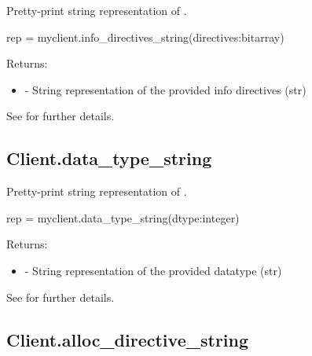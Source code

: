 \summary

Pretty-print string representation of .

\format

\pyspecificstart
\begin{codepar}
rep = myclient.info_directives_string(directives:bitarray)
\end{codepar}
\pyspecificend

\begin{arglist}
\end{arglist}

Returns:
\begin{itemize}
    \item {} - String representation of the provided info directives (str)
\end{itemize}

See  for further details.


\subsection{Client.data_type_string}

\summary

Pretty-print string representation of .

\format

\pyspecificstart
\begin{codepar}
rep = myclient.data_type_string(dtype:integer)
\end{codepar}
\pyspecificend

\begin{arglist}
\end{arglist}

Returns:
\begin{itemize}
    \item {} - String representation of the provided datatype (str)
\end{itemize}

See  for further details.


\subsection{Client.alloc_directive_string}

